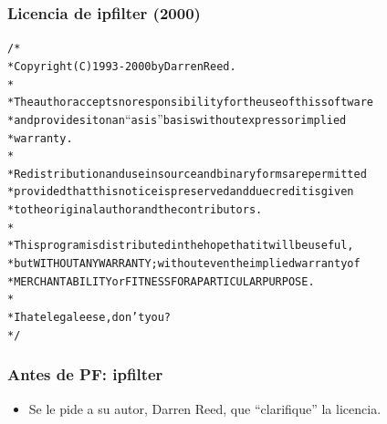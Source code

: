 \documentclass{beamer}
\begin{document}
\begin{frame}
\frametitle{Licencia de ipfilter (2000)}

\begin{alltt}
\footnotesize
/* \\
 * Copyright (C) 1993-2000 by Darren Reed. \\
 * \\
 * The author accepts no responsibility for the use of this software \\
 * and provides it on an ``as is'' basis without express or implied \\
 *  warranty. \\
 * \\
 * Redistribution and use in source and binary forms are permitted \\
 * provided that this notice is preserved and due credit is given \\
 * to the original author and the contributors. \\
 * \\
 * This program is distributed in the hope that it will be useful, \\
 * but WITHOUT ANY WARRANTY; without even the implied warranty of \\
 * MERCHANTABILITY or FITNESS FOR A PARTICULAR PURPOSE. \\
 * \\
 * I hate legaleese, don't you ? \\
 */

\end{alltt}

\end{frame}


\begin{frame}
\frametitle{Antes de PF: ipfilter}

\begin{itemize}
\item Se le pide a su autor, Darren Reed, que ``clarifique'' la licencia.
\end{itemize}

\end{frame}


\end{document}

